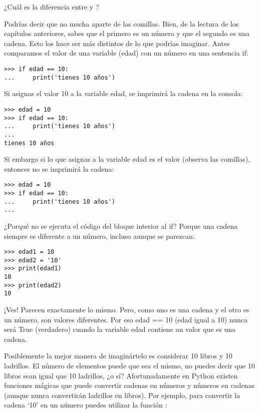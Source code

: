 ¿Cuál es la diferencia entre  y ?
\par
Podrías decir que no mucha aparte de las comillas.  Bien, de la lectura de los capítulos anteriores, sabes que el primero es un número y que el segundo es una cadena. Esto los hace ser más distintos de lo que podrías imaginar.  Antes comparamos el valor de una variable (edad) con un número en una sentencia if:

\begin{listing}
\begin{verbatim}
>>> if edad == 10:
...     print('tienes 10 años')
\end{verbatim}
\end{listing}

Si asignas el valor 10 a la variable edad, se imprimirá la cadena en la consola:

\begin{listing}
\begin{verbatim}
>>> edad = 10
>>> if edad == 10:
...     print('tienes 10 años')
...
tienes 10 años
\end{verbatim}
\end{listing}

Si embargo si lo que asignas a la variable edad es el valor  (observa las comillas), entonces no se imprimirá la cadena:

\begin{listing}
\begin{verbatim}
>>> edad = 10
>>> if edad == 10:
...     print('tienes 10 años')
...
\end{verbatim}
\end{listing}

¿Porqué no se ejecuta el código del bloque interior al if?  Porque una cadena siempre es diferente a un número, incluso aunque se parezcan:

\begin{listing}
\begin{verbatim}
>>> edad1 = 10
>>> edad2 = '10'
>>> print(edad1)
10
>>> print(edad2)
10
\end{verbatim}
\end{listing}

¡Ves!  Parecen exactamente lo mismo.  Pero, como uno es una cadena y el otro es un número, son valores diferentes.  Por eso edad == 10 (edad igual a 10) nunca será True (verdadero) cuando la variable edad contiene un valor que es una cadena.
\par
Posiblemente la mejor manera de imaginártelo es considerar 10 libros y 10 ladrillos.  El número de elementos puede que sea el mismo, no puedes decir que 10 libros sean igual que 10 ladrillos, ¿o sí?  Afortunadamente en Python existen funciones mágicas que puede convertir cadenas en números y números en cadenas (aunque nunca convertirán ladrillos en libros). Por ejemplo, para convertir la cadena `10' en un número puedes utilizar la función :

